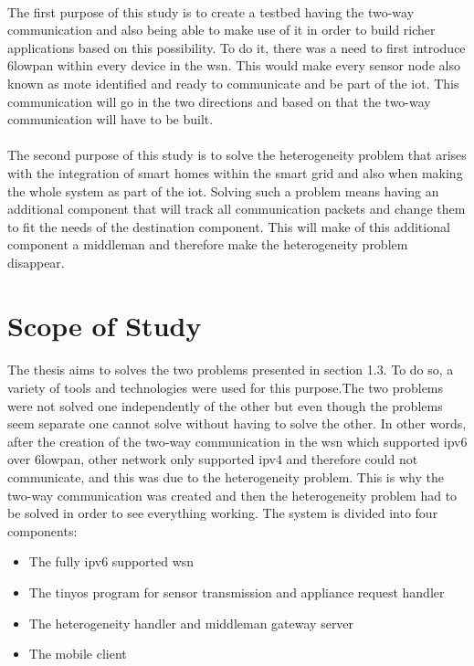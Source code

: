 \documentclass[oneside,12pt,a4paper,final]{book}
\begin{document}
\paragraph{}
The first purpose of this study is to create a testbed having the two-way communication and also being able to make use of it in order to build richer applications based on this possibility. To do it, there was a need to first introduce \gls{6lowpan} within every device in the \gls{wsn}. This would make every sensor node also known as mote identified and ready to communicate and be part of the \gls{iot}. This communication will go in the two directions and based on that the two-way communication will have to be built.
\paragraph{}
The second purpose of this study is to solve the heterogeneity problem that arises with the integration of smart homes within the smart grid and also when making the whole system as part of the \gls{iot}. Solving such a problem means having an additional component that will track all communication packets and change them to fit the needs of the destination component. This will make of this additional component a middleman and therefore make the heterogeneity problem disappear.

\section{Scope of Study}
\paragraph{}
The thesis aims to solves the two problems presented in section 1.3. To do so, a variety of tools and technologies were used for this purpose.The two problems were not solved one independently of the other but even though the problems seem separate one cannot solve without having to solve the other. In other words, after the creation of the two-way communication in the \gls{wsn} which supported \gls{ipv6} over \gls{6lowpan}, other network only supported \gls{ipv4} and therefore could not communicate, and this was due to the heterogeneity problem. This is why the two-way communication was created and then the heterogeneity problem had to be solved in order to see everything working.
The system is divided into four components:
\begin{itemize}
\item The fully \gls{ipv6} supported \gls{wsn}
\item The \gls{tinyos} program for sensor transmission and appliance request handler
\item The heterogeneity handler and middleman gateway server
\item The mobile client
\end{itemize}
\end{document}
